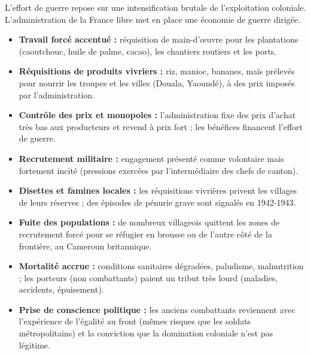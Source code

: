 \documentclass[11pt]{article}
\begin{document}
L'effort de guerre repose sur une intensification brutale de l'exploitation coloniale. L'administration de la France libre met en place une économie de guerre dirigée.

\begin{propriete}
\begin{itemize}
\item \textbf{Travail forcé accentué :} réquisition de main-d'œuvre pour les plantations (caoutchouc, huile de palme, cacao), les chantiers routiers et les ports.
\item \textbf{Réquisitions de produits vivriers :} riz, manioc, bananes, maïs prélevés pour nourrir les troupes et les villes (Douala, Yaoundé), à des prix imposés par l'administration.
\item \textbf{Contrôle des prix et monopoles :} l'administration fixe des prix d'achat très bas aux producteurs et revend à prix fort ; les bénéfices financent l'effort de guerre.
\item \textbf{Recrutement militaire :} engagement présenté comme volontaire mais fortement incité (pressions exercées par l'intermédiaire des chefs de canton).
\end{itemize}
\end{propriete}

\begin{attention}
\begin{itemize}
\item \textbf{Disettes et famines locales :} les réquisitions vivrières privent les villages de leurs réserves ; des épisodes de pénurie grave sont signalés en 1942-1943.
\item \textbf{Fuite des populations :} de nombreux villageois quittent les zones de recrutement forcé pour se réfugier en brousse ou de l'autre côté de la frontière, au Cameroun britannique.
\item \textbf{Mortalité accrue :} conditions sanitaires dégradées, paludisme, malnutrition ; les porteurs (non combattants) paient un tribut très lourd (maladies, accidents, épuisement).
\item \textbf{Prise de conscience politique :} les anciens combattants reviennent avec l'expérience de l'égalité au front (mêmes risques que les soldats métropolitains) et la conviction que la domination coloniale n'est pas légitime.
\end{itemize}
\end{attention}
\end{document}

